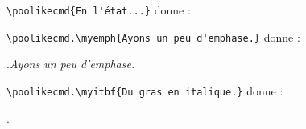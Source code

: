 \documentclass[varwidth, border = 3pt]{standalone}
\newcommand{\myemph}{\emph}
\begin{document}
\verb#\poolikecmd{En l'état...}# donne :



\medskip


\verb#\poolikecmd.\myemph{Ayons un peu d'emphase.}# donne :

\poolikecmd.\myemph{Ayons un peu d'emphase.}


\medskip


\verb#\poolikecmd.\myitbf{Du gras en italique.}# donne :

\poolikecmd.
\end{document}
